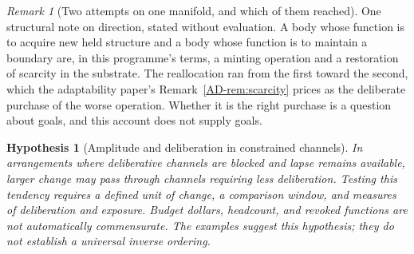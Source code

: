 \documentclass[11pt,a4paper]{article}
\newtheorem{hypothesis}[definition]{Hypothesis}
\theoremstyle{remark}
\newtheorem{remark}[definition]{Remark}
\begin{document}
\begin{remark}[Two attempts on one manifold, and which of them reached]
One structural note on direction, stated without evaluation. A body whose function is to acquire
new held structure and a body whose function is to maintain a boundary are, in this programme's terms, a
minting operation and a restoration of scarcity in the substrate. The reallocation ran from the
first toward the second, which the adaptability paper's Remark~\ref{AD-rem:scarcity} prices as the deliberate purchase of the worse
operation. Whether it is the right purchase is a question about goals, and this account does not supply
goals.
\end{remark}

\begin{hypothesis}[Amplitude and deliberation in constrained channels]\label{prop:amplitude-deliberation}
In arrangements where deliberative channels are blocked and lapse remains
available, larger change may pass through channels requiring less deliberation.
Testing this tendency requires a defined unit of change, a comparison window,
and measures of deliberation and exposure. Budget dollars, headcount, and revoked
functions are not automatically commensurate. The examples suggest this hypothesis;
they do not establish a universal inverse ordering.
\end{hypothesis}
\end{document}
